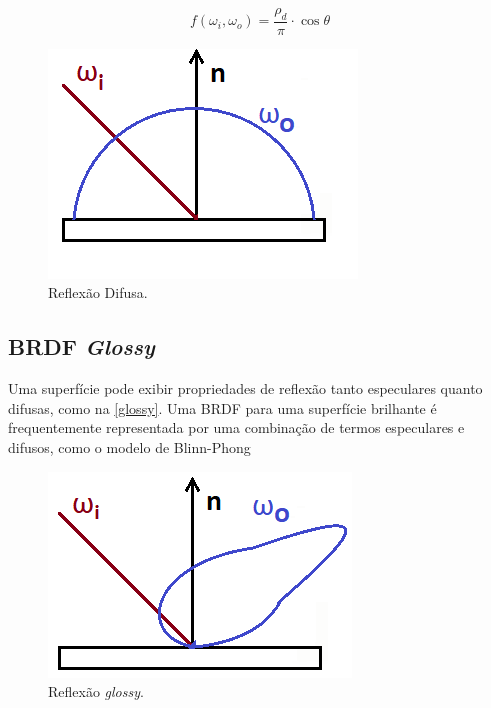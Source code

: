\documentclass[english, 
               brazil, 
               bsc] %
               {dcomp-abntex2}
\begin{document}
\begin{equation} \label{eq-diffuse}
f(\omega_i, \omega_o) = \frac{\rho_d}{\pi} \cdot \cos \theta
\end{equation}


\begin{figure}[H]
        \caption{\label{diffuse} \small Reflexão Difusa. }
        \begin{center}
            \includegraphics[scale=0.5]{./Imagens/diffuse-2d.png}
        \end{center}
\end{figure}


\subsection{BRDF \textit{Glossy}}
Uma superfície pode exibir propriedades de reflexão tanto especulares quanto difusas, como na \autoref{glossy}. Uma BRDF para uma superfície brilhante é frequentemente representada por uma combinação de termos especulares e difusos, como o modelo de Blinn-Phong \cite{blinn_phong}


\begin{figure}[H]
  \caption{\label{glossy} \small Reflexão \textit{glossy}. }
        \begin{center}
            \includegraphics[scale=0.5]{./Imagens/glossy-2d.png}
        \end{center}
\end{figure}
\end{document}
